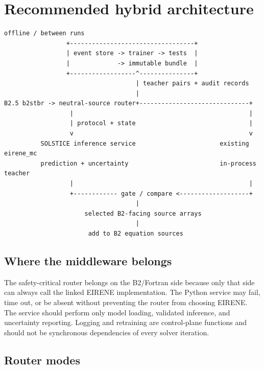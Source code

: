 \documentclass[11pt]{article}
\begin{document}
\section{Recommended hybrid architecture}

\begin{lstlisting}[basicstyle=\ttfamily\small,frame=single]
                         offline / between runs
                 +----------------------------------+
                 | event store -> trainer -> tests  |
                 |             -> immutable bundle  |
                 +------------------^---------------+
                                    | teacher pairs + audit records
                                    |
B2.5 b2stbr -> neutral-source router+------------------------------+
                  |                                                |
                  | protocol + state                               |
                  v                                                v
          SOLSTICE inference service                       existing eirene_mc
          prediction + uncertainty                         in-process teacher
                  |                                                |
                  +------------ gate / compare <-------------------+
                                    |
                      selected B2-facing source arrays
                                    |
                       add to B2 equation sources
\end{lstlisting}

\subsection{Where the middleware belongs}

The safety-critical router belongs on the B2/Fortran side because only that side can always call the linked EIRENE implementation. The Python service may fail, time out, or be absent without preventing the router from choosing EIRENE. The service should perform only model loading, validated inference, and uncertainty reporting. Logging and retraining are control-plane functions and should not be synchronous dependencies of every solver iteration.

\subsection{Router modes}
\end{document}
